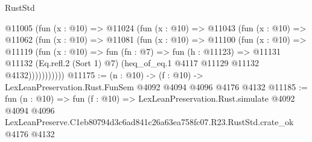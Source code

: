 \begin{lexlean}{RustStd}
\begin{coremodule}
        @11005
          (fun (x : @10) =>
          @11024
            (fun (x : @10) =>
            @11043
              (fun (x : @10) =>
              @11062
                (fun (x : @10) =>
                @11081
                  (fun (x : @10) =>
                  @11100
                    (fun (x : @10) =>
                    @11119
                      (fun (x : @10) =>
                      fun (fn : @7) =>
                      fun (h : @11123) =>
                      @11131
                        @11132
                        (Eq.refl.{2} (Sort 1) @7)
                        (heq_of_eq.{1} @4117 @11129 @11132 @4132)))))))))))
@11175 := (n : @10) -> (f : @10) -> LexLeanPreservation.Rust.FunSem @4092 @4094 @4096 @4176 @4132
@11185 := fun (n : @10) =>
  fun (f : @10) =>
  LexLeanPreservation.Rust.simulate
    @4092
    @4094
    @4096
    LexLeanPreserve.C1eb80794d3c6ad841c26a63ea758fc07.R23.RustStd.crate_ok
    @4176
    @4132
\end{coremodule}
\end{lexlean}

